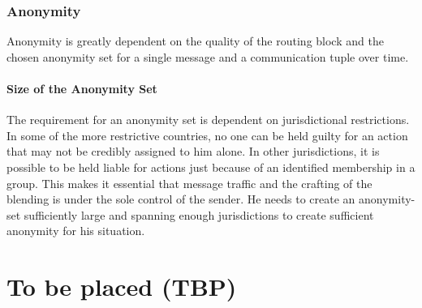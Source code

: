 \subsection{Anonymity}
Anonymity is greatly dependent on the quality of the routing block and the chosen anonymity set for a single message and a communication tuple over time. 

\subsubsection{Size of the Anonymity Set}
The requirement for an anonymity set is dependent on jurisdictional restrictions. In some of the more restrictive countries, no one can be held guilty for an action that may not be credibly assigned to him alone. In other jurisdictions, it is possible to be held liable for actions just because of an identified membership in a group. This makes it essential that message traffic and the crafting of the blending is under the sole control of the sender. He needs to create an anonymity-set sufficiently large and spanning enough jurisdictions to create sufficient anonymity for his situation.

\chapter{To be placed (TBP)}

